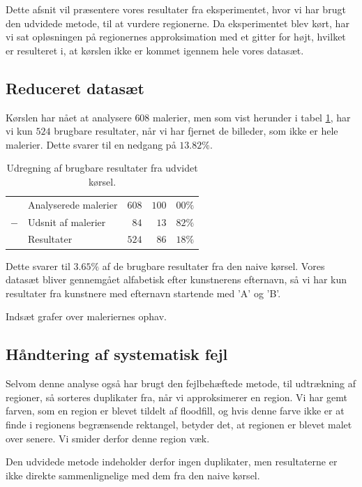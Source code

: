 {
{\sffamily Dette afsnit vil præsentere vores resultater fra
eksperimentet, hvor vi har brugt den udvidede metode, til at vurdere
regionerne. Da eksperimentet blev kørt, har vi sat opløsningen på
regionernes approksimation med et gitter for højt, hvilket er resulteret
i, at kørslen ikke er kommet igennem hele vores datasæt.
}

\subsection{Reduceret datasæt}
Kørslen har nået at analysere $608$ malerier, men som vist herunder i
tabel \ref{ud_tabel_fjern_detaljer}, har vi kun $524$ brugbare
resultater, når vi har fjernet de billeder, som ikke er hele malerier.
Dette svarer til en nedgang på $13.82\%$.

\begin{table}[H]
    \centering
    \begin{tabular}{r@{\ \ }p{12em}r|r@{.}l}
            & Analyserede malerier & $608$ & $100$ & $00\%$   \\
        $-$ & Udsnit af malerier   &  $84$ &  $13$ & $82\%$   \\\hline
            & Resultater           & $524$ &  $86$ & $18\%$
    \end{tabular}
    \caption[]{Udregning af brugbare resultater fra udvidet kørsel.}
    \label{ud_tabel_fjern_detaljer}
\end{table}

Dette svarer til $\mathsf{3.65\%}$ af de brugbare resultater fra den
naive kørsel. Vores datasæt bliver gennemgået alfabetisk efter
kunstnerens efternavn, så vi har kun resultater fra kunstnere med
efternavn startende med 'A' og 'B'.

Indsæt grafer over maleriernes ophav.


\subsection{Håndtering af systematisk fejl}
Selvom denne analyse også har brugt den fejlbehæftede metode, til
udtrækning af regioner, så sorteres duplikater fra, når vi approksimerer
en region. Vi har gemt farven, som en region er blevet tildelt af
floodfill, og hvis denne farve ikke er at finde i regionens begrænsende
rektangel, betyder det, at regionen er blevet malet over senere. Vi
smider derfor denne region væk.

Den udvidede metode indeholder derfor ingen duplikater, men resultaterne
er ikke direkte sammenlignelige med dem fra den naive kørsel.

}
